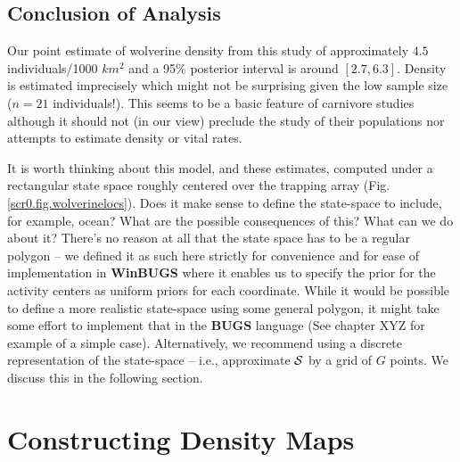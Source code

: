 \subsection{Conclusion of Analysis}

Our point estimate of wolverine density from this study of
approximately $4.5$ individuals/1000 $km^2$ and a 95\% posterior
interval is around $[2.7, 6.3]$. Density is estimated imprecisely
which might not be surprising given the low sample size ($n=21$
individuals!). This seems to be a basic feature of carnivore studies
although it should not (in our view) preclude the study of their
populations nor attempts to estimate density or vital rates.

It is worth thinking about this model, and these estimates, computed
under a rectangular state space roughly centered over the trapping
array (Fig. \ref{scr0.fig.wolverinelocs}).
Does it make sense to define the state-space to
include, for example, ocean? What are the possible consequences of
this? What can we do about it?  There's no reason at all that the
state space has to be a regular polygon -- we defined it as such here
strictly for convenience and for ease of implementation in {\bf WinBUGS}
where it enables us to specify the prior for the activity centers as
uniform priors for each coordinate.  While it would be possible to
define a more realistic state-space using some general polygon, it
might take some effort to implement that in the {\bf BUGS} language (See
chapter XYZ for example of a simple case). Alternatively, we recommend
using a discrete representation of the state-space -- i.e., approximate
${\cal S}$ by a grid of $G$ points. We discuss this in the following
section.

\section{Constructing Density Maps}
\label{scr0.sec.mapping}


